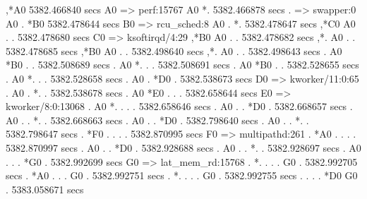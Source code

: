                          ,*A0                                        5382.466840 secs A0 => perf:15767
                           A0                 *.                     5382.466878 secs .  => swapper:0
                           A0                  .              *B0    5382.478644 secs B0 => rcu_sched:8
                           A0                  .              *.     5382.478647 secs
                 ,*C0      A0                  .               .     5382.478680 secs C0 => ksoftirqd/4:29
                 ,*B0      A0                  .               .     5382.478682 secs
                 ,*.       A0                  .               .     5382.478685 secs
                 ,*B0      A0                  .               .     5382.498640 secs
                 ,*.       A0                  .               .     5382.498643 secs
                   .       A0             *B0  .               .     5382.508689 secs
                   .       A0             *.   .               .     5382.508691 secs
                   .       A0             *B0  .               .     5382.528655 secs
                   .       A0             *.   .               .     5382.528658 secs
                   .       A0              .  *D0              .     5382.538673 secs D0 => kworker/11:0:65
                   .       A0              .  *.               .     5382.538678 secs
                   .       A0     *E0      .   .               .     5382.658644 secs E0 => kworker/8:0:13068
                   .       A0     *.       .   .               .     5382.658646 secs
                   .       A0      .       .  *D0              .     5382.668657 secs
                   .       A0      .       .  *.               .     5382.668663 secs
                   .       A0      .       .  *D0              .     5382.798640 secs
                   .       A0      .       .  *.               .     5382.798647 secs
                   .      *F0      .       .   .               .     5382.870995 secs F0 => multipathd:261
                   .      *A0      .       .   .               .     5382.870997 secs
                   .       A0      .       .  *D0              .     5382.928688 secs
                   .       A0      .       .  *.               .     5382.928697 secs
                   .       A0      .       .   .  *G0          .     5382.992699 secs G0 => lat_mem_rd:15768
                   .      *.       .       .   .   G0          .     5382.992705 secs
                   .      *A0      .       .   .   G0          .     5382.992751 secs
                   .      *.       .       .   .   G0          .     5382.992755 secs
                   .       .       .       .  *D0  G0          .     5383.058671 secs
\stoptyping

